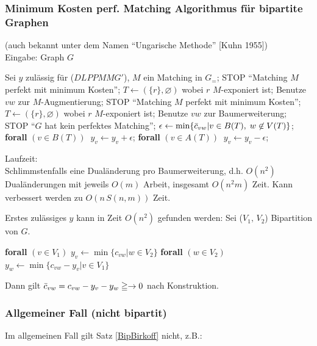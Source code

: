 \subsubsection{Minimum Kosten perf. Matching Algorithmus für bipartite
Graphen}
(auch bekannt unter dem Namen "`Ungarische Methode"' [Kuhn 1955])\\
Eingabe: Graph $G$
\begin{algorithmic}
\STATE Sei $y$ zulässig für ($DLPPMMG'$), $M$ ein Matching in $G_{=}$;
\STATE STOP "`Matching $M$ perfekt mit minimum Kosten"';
\ENDIF
\STATE $T\leftarrow (\{r\}, \varnothing)$ wobei $r$ $M$-exponiert ist;
\LOOP 
{}
\STATE Benutze $v w$ zur $M$-Augmentierung;
\STATE STOP "`Matching $M$ perfekt mit minimum Kosten"';
\ELSE
\STATE $T\leftarrow (\{r\},\varnothing)$ wobei $r$ $M$-exponiert ist;
\ENDIF
\ELSE
\STATE Benutze $v w$ zur Baumerweiterung;
\ENDIF
\ENDWHILE
{} 
\STATE STOP "`$G$ hat kein perfektes Matching"';
\ELSE
\STATE $\epsilon \leftarrow \min\{\bar{c}_{vw} | v \in B(T), \; w \not\in
V(T)\}$;
\STATE \textbf{forall} $(v \in B(T)) \; \; y_v \leftarrow y_v + \epsilon$;
\STATE \textbf{forall} $(v \in A(T)) \; \; y_v \leftarrow y_v - \epsilon$;
\ENDIF
\ENDLOOP
\end{algorithmic}

Laufzeit:\\
Schlimmstenfalls eine Dualänderung pro Baumerweiterung, d.h. $O(n^2)$
Dualänderungen mit jeweils $O(m)$ Arbeit, insgesamt $O(n^2m)$ Zeit. Kann
verbessert werden zu $O(n \, S(n,m))$ Zeit.

Erstes zulässiges $y$ kann in Zeit $O(n^2)$ gefunden werden:
Sei ($V_1,\,V_2$) Bipartition von $G$.
\begin{algorithmic}
\STATE \textbf{forall} $(v \in V_1)$ $y_v \leftarrow \min \{c_{v w}| w \in
V_2\}$
\STATE \textbf{forall} $(w \in V_2)$ $y_w \leftarrow \min \{c_{v w}-y_v | v
\in V_1\}$ 
\end{algorithmic}
Dann gilt $\bar{c}_{v w} = c_{v w} - y_v - y_w \geqq \rightarrow 0$ nach
Konstruktion.

\subsubsection{Allgemeiner Fall (nicht bipartit)}

Im allgemeinen Fall gilt Satz \ref{BipBirkoff} nicht, z.B.:

